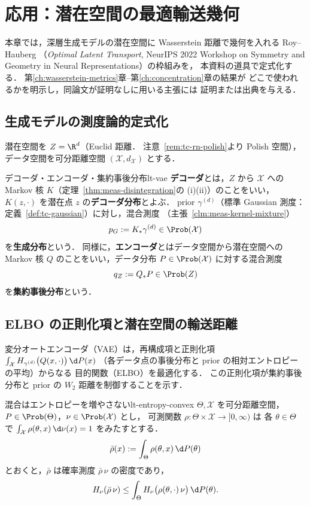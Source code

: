 \chapter{応用：潜在空間の最適輸送幾何}
\label{ch:latent}

本章では，深層生成モデルの潜在空間に Wasserstein 距離で幾何を入れる
Roy--Hauberg
（\emph{Optimal Latent Transport}, NeurIPS 2022 Workshop on
Symmetry and Geometry in Neural Representations）の枠組みを，
本資料の道具で定式化する．
第\ref{ch:wasserstein-metrics}章--第\ref{ch:concentration}章の結果が
どこで使われるかを明示し，同論文が証明なしに用いる主張には
証明または出典を与える．

\section{生成モデルの測度論的定式化}
\label{sec:lt-setup}

潜在空間を $Z=\R^d$（Euclid 距離．
注意~\ref{rem:tc-rn-polish}より Polish 空間），
データ空間を可分距離空間 $(\mathcal{X},d_{\mathcal{X}})$ とする．

\begin{definition}{デコーダ・エンコーダ・集約事後分布}{lt-vae}
  \textbf{デコーダ}とは，$Z$ から $\mathcal{X}$ への Markov 核
  $K$（定理~\ref{thm:meas-disintegration}の (i)(ii)）のことをいい，
  $K(z,\cdot)$ を潜在点 $z$ の\textbf{デコーダ分布}とよぶ．
  prior $\gamma^{(d)}$（標準 Gaussian 測度：
  定義~\ref{def:tc-gaussian}）に対し，混合測度
  （主張~\ref{clm:meas-kernel-mixture}）
  \[
    p_G:=K_*\gamma^{(d)}\in\Prob(\mathcal{X})
  \]
  を\textbf{生成分布}という．
  同様に，\textbf{エンコーダ}とはデータ空間から潜在空間への
  Markov 核 $Q$ のことをいい，データ分布
  $P\in\Prob(\mathcal{X})$ に対する混合測度
  \[
    q_Z:=Q_*P\in\Prob(Z)
  \]
  を\textbf{集約事後分布}という．
\end{definition}

\section{ELBO の正則化項と潜在空間の輸送距離}
\label{sec:lt-elbo}

変分オートエンコーダ（VAE）は，再構成項と正則化項
$\int_{\mathcal{X}}H_{\gamma^{(d)}}\bigl(Q(x,\cdot)\bigr)\,\d P(x)$
（各データ点の事後分布と prior の相対エントロピーの平均）からなる
目的関数（ELBO）を最適化する．
この正則化項が集約事後分布と prior の $W_2$ 距離を制御することを示す．

\begin{lemma}{混合はエントロピーを増やさない}{lt-entropy-convex}
  $\Theta,\mathcal{X}$ を可分距離空間，
  $P\in\Prob(\Theta)$，$\nu\in\Prob(\mathcal{X})$ とし，
  可測関数 $\rho\colon\Theta\times\mathcal{X}\to[0,\infty)$ は
  各 $\theta\in\Theta$ で
  $\int_{\mathcal{X}}\rho(\theta,x)\,\d\nu(x)=1$ をみたすとする．
  \[
    \bar\rho(x):=\int_\Theta\rho(\theta,x)\,\d P(\theta)
  \]
  とおくと，$\bar\rho$ は確率測度 $\bar\rho\,\nu$ の密度であり，
  \[
    H_\nu(\bar\rho\,\nu)
    \leq\int_\Theta H_\nu\bigl(\rho(\theta,\cdot)\,\nu\bigr)\,\d P(\theta).
  \]
\end{lemma}

